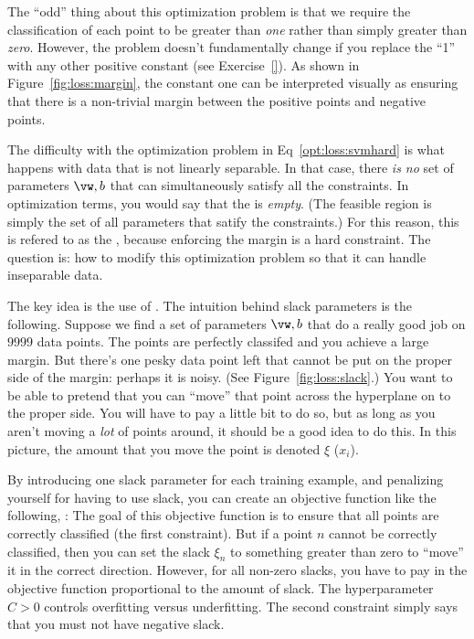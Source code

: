 
The ``odd'' thing about this optimization problem is that we require
the classification of each point to be greater than \emph{one} rather
than simply greater than \emph{zero}.  However, the problem doesn't
fundamentally change if you replace the ``1'' with any other positive
constant (see Exercise~\ref{}).  As shown in
Figure~\ref{fig:loss:margin}, the constant one can be interpreted
visually as ensuring that there is a non-trivial margin between the
positive points and negative points.

The difficulty with the optimization problem in
Eq~\eqref{opt:loss:svmhard} is what happens with data that is not
linearly separable.  In that case, there \emph{is no} set of
parameters $\vw,b$ that can simultaneously satisfy all the
constraints.  In optimization terms, you would say that the
 is \emph{empty}.  (The feasible region is
simply the set of all parameters that satify the constraints.)  For
this reason, this is refered to as the ,
because enforcing the margin is a hard constraint.  The question is:
how to modify this optimization problem so that it can handle
inseparable data.


The key idea is the use of .  The intuition
behind slack parameters is the following.  Suppose we find a set of
parameters $\vw,b$ that do a really good job on $9999$ data points.
The points are perfectly classifed and you achieve a large margin.
But there's one pesky data point left that cannot be put on the proper
side of the margin: perhaps it is noisy.  (See
Figure~\ref{fig:loss:slack}.)  You want to be able to pretend that you
can ``move'' that point across the hyperplane on to the proper side.
You will have to pay a little bit to do so, but as long as you aren't
moving a \emph{lot} of points around, it should be a good idea to do
this.  In this picture, the amount that you move the point is denoted
$\xi$ ($x_i$).

By introducing one slack parameter for each training example, and
penalizing yourself for having to use slack, you can create an
objective function like the following, :
%
%
The goal of this objective function is to ensure that all points are
correctly classified (the first constraint).  But if a point $n$
cannot be correctly classified, then you can set the slack $\xi_n$ to
something greater than zero to ``move'' it in the correct direction.
However, for all non-zero slacks, you have to pay in the objective
function proportional to the amount of slack.  The hyperparameter
$C>0$ controls overfitting versus underfitting.  The second constraint
simply says that you must not have negative slack.

